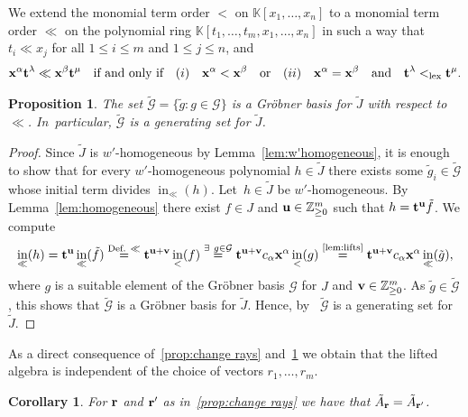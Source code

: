\documentclass[10pt,a4paper]{amsart}
\newcommand{\thlabel}[1]{\label{#1}}
\newcommand{\thref}[1]{\ref{#1}}
\newtheorem{Corollary}[Theorem]{Corollary}
\newtheorem{Proposition}[Theorem]{Proposition}
\numberwithin{equation}{section}
\DeclareMathOperator{\init}{in}
\begin{document}
We extend the monomial term order $<$ on $\mathbb K[x_1,\dots,x_n]$ to a monomial term order $\ll$ on the polynomial ring $\mathbb K[t_1,\dots,t_m,x_1,\dots,x_n]$
in such a way that $t_i\ll x_j$ for all $1\le i\le m$ and $1\le j\le n$, and
\begin{gather}\label{eq:<<}
{\bf x}^\alpha{\bf t}^{\lambda}\ll{\bf x}^\beta{\bf t}^{\mu}\quad\text{if and only if}\quad
(i)\quad {\bf x}^\alpha<{\bf x}^\beta \quad \text{or}\quad
(ii)\quad {\bf x}^\alpha={\bf x}^\beta\quad \text{and}\quad {\bf t}^{\lambda}<_{\rm lex}{\bf t}^{\mu}.
\end{gather}

\begin{Proposition}\thlabel{prop:lifted generators}
The set $\tilde{\mathcal{G}} =\{\tilde g\colon g\in \mathcal G\}$ is a Gr\"obner basis for $ \tilde{J}$ with respect to $\ll$. In~par\-ticular, $\tilde{\mathcal{G}} $ is a generating set for $\tilde{J}$.
\end{Proposition}
\begin{proof}
Since $\tilde{J}$ is $w'$-homogeneous by Lemma~\ref{lem:w'homogeneous}, it is enough to show that for every $w'$-homogeneous polynomial $h\in \tilde{J}$ there exists some $\tilde g_i\in\tilde{\mathcal{G}} $ whose initial term divides
$\init_\ll(h)$.
Let~$h\in \tilde{J}$ be $w'$-homogeneous.
By Lemma~\ref{lem:homogeneous} there exist $f\in J$ and ${\bf u}\in \mathbb{Z}_{\geq 0}^m$ such that $h={\bf t}^{\bf u}\tilde{f}$. We compute
\begin{gather*}
\init_{\ll}(h) = {\bf t}^{\bf u}\init_{\ll}(\tilde f) \overset{\text{Def. }\ll}{=} {\bf t}^{{\bf u}+{\bf v}}\init_<(f)
\overset{\exists \ g\in \mathcal G}{=} {\bf t}^{{\bf u}+{\bf v}}c_\alpha{\bf x}^{\alpha}\init_{<}(g) \overset{\text{\thref{lem:lifts}}}{=} {\bf t}^{{\bf u}+{\bf v}}c_\alpha{\bf x}^{\alpha}\init_{\ll}(\tilde g),
\end{gather*}
where $g$ is a suitable element of the Gr\"obner basis $\mathcal G$ for $J$ and ${\bf v}\in \mathbb Z_{\ge 0}^m$.
As $\tilde g\in \tilde{\mathcal{G}}$, this shows that $\tilde{\mathcal{G}}$ is a Gr\"obner basis for $\tilde{J}$.
Hence, by~\cite[Theorem~2.1.8]{herzog2011monomial} $\tilde{\mathcal{G}}$ is a generating set for $\tilde{J}$.
\end{proof}





As a direct consequence of~\thref{prop:change rays} and~\thref{prop:lifted generators} we obtain that the lifted algebra is independent of the choice of vectors $r_1, \dots ,r_m$.
\begin{Corollary}
For ${\bf r}$ and ${\bf r}'$ as in~\thref{prop:change rays} we have that $\tilde{A}_{\bf r} = \tilde{A}_{\bf r '}$.
\end{Corollary}
\end{document}
